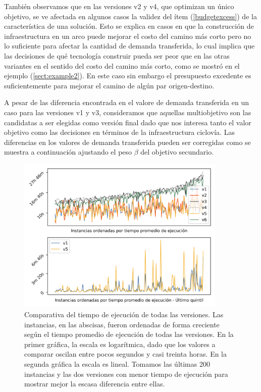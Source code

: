 \documentclass{article}
\begin{document}
  También observamos que en las versiones v2 y v4, que optimizan un único objetivo, se ve afectada en algunos casos la validez del ítem (\ref{budgetexcess}) de la característica de una solución. Esto se explica en casos en que la construcción de infraestructura en un arco puede mejorar el costo del camino más corto pero no lo suficiente para afectar la cantidad de demanda transferida, lo cual implica que las decisiones de qué tecnología construir pueda ser peor que en las otras variantes en el sentido del costo del camino más corto, como se mostró en el ejemplo (\ref{sect:example2}). En este caso sin embargo el presupuesto excedente es suficientemente para mejorar el camino de algún par origen-destino.

  A pesar de las diferencia encontrada en el valore de demanda transferida en un caso para las versiones v1 y v3, consideramos que aquellas multiobjetivo son las candidatas a ser elegidas como versión final dado que nos interesa tanto el valor objetivo como las decisiones en términos de la infraestructura ciclovía. Las diferencias en los valores de demanda transferida pueden ser corregidas como se muestra a continuación ajustando el peso $\beta$ del objetivo secundario.

  \begin{figure}[h!]
    \centering
    \includegraphics[width=10cm]{../resources/run_time_comparsion.png}
    \caption{Comparativa del tiempo de ejecución de todas las versiones. Las instancias, en las abscisas, fueron ordenadas de forma creciente según el tiempo promedio de ejecución de todas las versiones. En la primer gráfica, la escala es logarítmica, dado que los valores a comparar oscilan entre pocos segundos y casi treinta horas. En la segunda gráfica la escala es lineal. Tomamos las últimas 200 instancias y las dos versiones con menor tiempo de ejecución para mostrar mejor la escasa diferencia entre ellas.}
    \label{fig:runtimecomparison}
  \end{figure}
\end{document}
